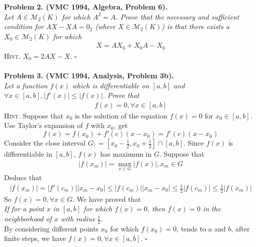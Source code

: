 \documentclass{article}
\numberwithin{equation}{section}
\begin{document}
\textbf{Problem 2. (VMC 1994, Algebra, Problem 6).}\\
 \textit{Let $A \in {\mathcal{M}_2}\left( K \right)$ for which $A^2=A$. Prove that the necessary and sufficient condition for $AX-XA=0_2$ (where $X \in {\mathcal{M}_2}\left( K \right)$) is that there exists a $X_0 \in {\mathcal{M}_2}\left( K \right)$ for which}
\begin{align}
 X = A{X_0} + {X_0}A - {X_0}
\end{align}
\textsc{Hint.} ${X_0} = 2AX - X$. \hfill $\square$\\
\\
\textbf{Problem 3. (VMC 1994, Analysis, Problem 3b).}\\
 \textit{Let a function $f(x)$ which is differentiable on $[a,b]$ and $\forall x \in \left[ {a,b} \right],\left| {f'\left( x \right)} \right| \le \left| {f\left( x \right)} \right|$. Prove that}
\begin{align}
f\left( x \right) = 0,\forall x \in \left[ {a,b} \right]
\end{align}
\textsc{Hint.} Suppose that $x_0$ is the solution of the equation $f(x)=0$ for $x_0 \in [a,b]$. Use Taylor's expansion of $f$ with $x_0$, get
\begin{equation}
f\left( x \right) = f\left( {{x_0}} \right) + f'\left( c \right)\left( {x - {x_0}} \right) = f'\left( c \right)\left( {x - {x_0}} \right)
\end{equation}
Consider the close interval $G: = \left[ {{x_0} - \frac{1}{2},{x_0} + \frac{1}{2}} \right] \cap \left[ {a,b} \right]$. Since $f(x)$ is differentiable in $[a,b]$, $f(x)$ has maximum in $G$. Suppose that
\begin{align}
\left| {f\left( {{x_m}} \right)} \right| = \mathop {\max }\limits_{x \in G} \left| {f\left( x \right)} \right|,{x_m} \in G
\end{align}
Deduce that
\begin{align}
\left| {f\left( {{x_m}} \right)} \right| = \left| {f'\left( {{c_m}} \right)} \right|\left| {{x_m} - {x_0}} \right| \le \left| {f\left( {{c_m}} \right)} \right|\left| {{x_m} - {x_0}} \right| \le \frac{1}{2}\left| {f\left( {{c_m}} \right)} \right| \le \frac{1}{2}\left| {f\left( {{x_m}} \right)} \right|
\end{align}
So $f\left( x \right) = 0,\forall x \in G$. We have proved that\\ \textit{If for a point $x$ in $[a,b]$ for which $f(x)=0$, then $f(x)=0$ in the neighborhood of $x$ with radius $\frac{1}{2}$.}\\
By considering different points $x_0$ for which $f(x_0)=0$, tends to $a$ and $b$, after finite steps, we have $f\left( x \right) = 0,\forall x \in \left[ {a,b} \right]$. \hfill $\square$\\
\end{document}
